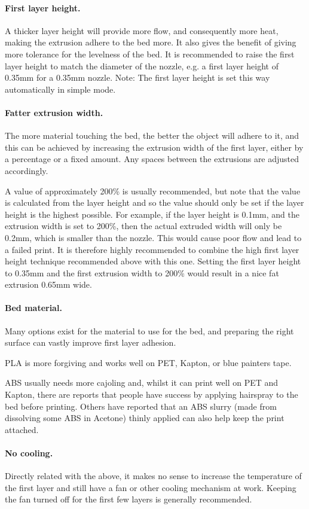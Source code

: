 \paragraph{First layer height.} %
\label{par:first_layer_height}
A thicker layer height will provide more flow, and consequently more heat, making the extrusion adhere to the bed more.  It also gives the benefit of giving more tolerance for the levelness of the bed.  It is recommended to raise the first layer height to match the diameter of the nozzle, e.g. a first layer height of 0.35mm for a 0.35mm nozzle.
Note: The first layer height is set this way automatically in simple mode.

\paragraph{Fatter extrusion width.} %
\label{par:wider_extrusion_width}
The more material touching the bed, the better the object will adhere to it, and this can be achieved by increasing the extrusion width of the first layer, either by a percentage or a fixed amount.  Any spaces between the extrusions are adjusted accordingly.

A value of approximately 200\% is usually recommended, but note that the value is calculated from the layer height and so the value should only be set if the layer height is the highest possible.  For example, if the layer height is 0.1mm, and the extrusion width is set to 200\%, then the actual extruded width will only be 0.2mm, which is smaller than the nozzle.   This would cause poor flow and lead to a failed print.  It is therefore highly recommended to combine the high first layer height technique recommended above with this one. Setting the first layer height to 0.35mm and the first extrusion width to 200\% would result in a nice fat extrusion 0.65mm wide.

\paragraph{Bed material.} %
\label{par:bed_material}
Many options exist for the material to use for the bed, and preparing the right surface can vastly improve first layer adhesion.  

PLA is more forgiving and works well on PET, Kapton, or blue painters tape.  

ABS usually needs more cajoling and, whilst it can print well on PET and Kapton, there are reports that people have success by applying hairspray to the bed before printing.  Others have reported that an ABS slurry (made from dissolving some ABS in Acetone) thinly applied can also help keep the print attached.

\paragraph{No cooling.} %
\label{par:no_cooling}
Directly related with the above, it makes no sense to increase the temperature of the first layer and still have a fan or other cooling mechanism at work.  Keeping the fan turned off for the first few layers is generally recommended.
